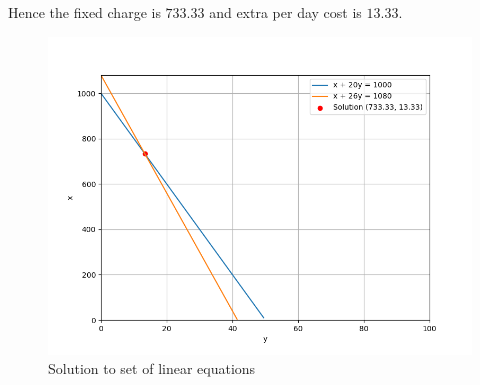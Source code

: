 \documentclass[journal]{IEEEtran}
\begin{document}
 Hence the fixed charge is \rupee $733.33$ and extra per day cost is \rupee $13.33$.
 
 \begin{figure}[h!]
   \centering
   \includegraphics[width=1\columnwidth]{figs/fig.png}
    \caption{Solution to set of linear equations}
\end{figure}
 
\end{document}
